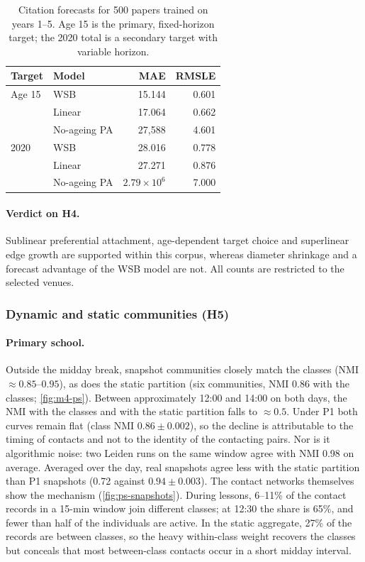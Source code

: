 \begin{table}[t]
\centering\small
\setlength{\tabcolsep}{4pt}
\begin{tabular*}{\columnwidth}{@{\extracolsep{\fill}}llrr@{}}
\toprule Target & Model & MAE & RMSLE\\
\midrule
Age 15 & WSB & 15.144 & 0.601\\
 & Linear & 17.064 & 0.662\\
 & No-ageing PA & 27,588 & 4.601\\
\midrule
2020 & WSB & 28.016 & 0.778\\
 & Linear & 27.271 & 0.876\\
 & No-ageing PA & $2.79\!\times\!10^6$ & 7.000\\
\bottomrule
\end{tabular*}
\caption{Citation forecasts for 500 papers trained on years 1--5. Age 15 is the primary,
fixed-horizon target; the 2020 total is a secondary target with variable horizon.}
\label{tab:b-forecast}
\end{table}

\paragraph{Verdict on H4.}
Sublinear preferential attachment, age-dependent target choice and superlinear edge growth
are supported within this corpus, whereas diameter shrinkage and a forecast advantage of the
WSB model are not. All counts are restricted to the selected venues.

\subsubsection{Dynamic and static communities (H5)}
\paragraph{Primary school.}
Outside the midday break, snapshot communities closely match the classes (NMI
$\approx 0.85$--$0.95$), as does the static partition (six communities, NMI 0.86 with the
classes; \cref{fig:m4-ps}). Between approximately 12:00 and 14:00 on both days, the NMI with
the classes and with the static partition falls to $\approx 0.5$. Under P1 both curves remain
flat (class NMI $0.86\pm0.002$), so the decline is attributable to the timing of contacts
and not to the identity of the contacting pairs. Nor is it algorithmic noise: two Leiden runs
on the same window agree with NMI 0.98 on average. Averaged over the day, real snapshots agree
less with the static partition than P1 snapshots (0.72 against $0.94\pm0.003$).
The contact networks themselves show the mechanism (\cref{fig:ps-snapshots}). During lessons,
6--11\% of the contact records in a 15-min window join different classes; at 12:30 the
share is 65\%, and fewer than half of the individuals are active. In the static aggregate,
27\% of the records are between classes, so the heavy within-class weight recovers the
classes but conceals that most between-class contacts occur in a short midday interval.


